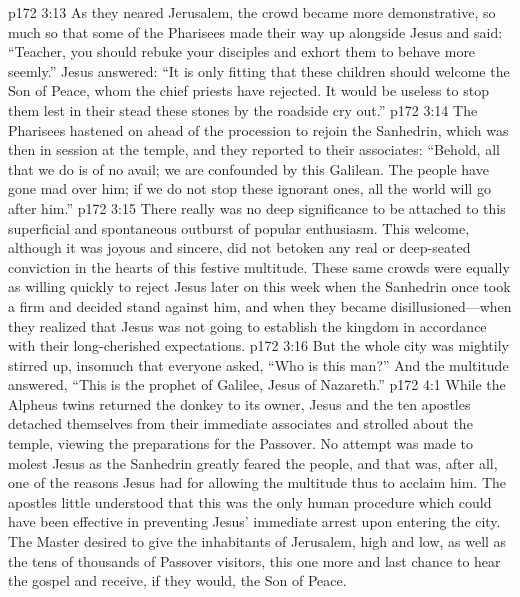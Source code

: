 \vs p172 3:13 As they neared Jerusalem, the crowd became more demonstrative, so much so that some of the Pharisees made their way up alongside Jesus and said: “Teacher, you should rebuke your disciples and exhort them to behave more seemly.” Jesus answered: \textcolor{ubdarkred}{“It is only fitting that these children should welcome the Son of Peace, whom the chief priests have rejected. It would be useless to stop them lest in their stead these stones by the roadside cry out.”}
\vs p172 3:14 The Pharisees hastened on ahead of the procession to rejoin the Sanhedrin, which was then in session at the temple, and they reported to their associates: “Behold, all that we do is of no avail; we are confounded by this Galilean. The people have gone mad over him; if we do not stop these ignorant ones, all the world will go after him.”
\vs p172 3:15 There really was no deep significance to be attached to this superficial and spontaneous outburst of popular enthusiasm. This welcome, although it was joyous and sincere, did not betoken any real or deep\hyp{}seated conviction in the hearts of this festive multitude. These same crowds were equally as willing quickly to reject Jesus later on this week when the Sanhedrin once took a firm and decided stand against him, and when they became disillusioned---when they realized that Jesus was not going to establish the kingdom in accordance with their long\hyp{}cherished expectations.
\vs p172 3:16 But the whole city was mightily stirred up, insomuch that everyone asked, “Who is this man?” And the multitude answered, “This is the prophet of Galilee, Jesus of Nazareth.”
\vs p172 4:1 While the Alpheus twins returned the donkey to its owner, Jesus and the ten apostles detached themselves from their immediate associates and strolled about the temple, viewing the preparations for the Passover. No attempt was made to molest Jesus as the Sanhedrin greatly feared the people, and that was, after all, one of the reasons Jesus had for allowing the multitude thus to acclaim him. The apostles little understood that this was the only human procedure which could have been effective in preventing Jesus’ immediate arrest upon entering the city. The Master desired to give the inhabitants of Jerusalem, high and low, as well as the tens of thousands of Passover visitors, this one more and last chance to hear the gospel and receive, if they would, the Son of Peace.
